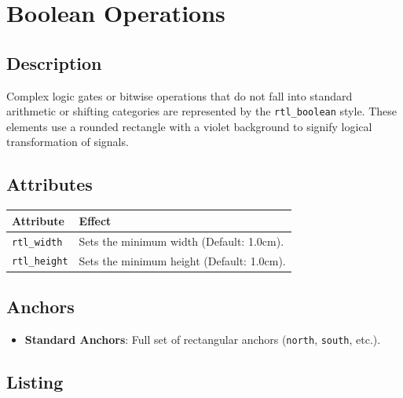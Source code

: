 \section{\sffamily Boolean Operations}

    \subsection{\sffamily Description}
        Complex logic gates or bitwise operations that do not fall into standard arithmetic or shifting categories are represented by the \texttt{rtl\_boolean} style. These elements use a rounded rectangle with a violet background to signify logical transformation of signals.

    \subsection{\sffamily Attributes}
    \begin{center}
        \begin{tabular}{lp{8cm}}
        \toprule
            \textbf{Attribute} & \textbf{Effect} \\
            \midrule
            \texttt{rtl\_width} & Sets the minimum width (Default: 1.0cm). \\
            \texttt{rtl\_height} & Sets the minimum height (Default: 1.0cm). \\
            \bottomrule
        \end{tabular}
    \end{center}

    \subsection{\sffamily Anchors}
        \begin{itemize}
            \item \textbf{Standard Anchors}: Full set of rectangular anchors (\texttt{north}, \texttt{south}, etc.).
        \end{itemize}

    \subsection{\sffamily Listing}
\begin{RTLexample}
\end{RTLexample}
